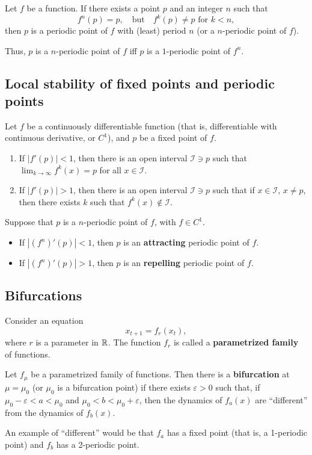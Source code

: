 \begin{definition}
Let $f$ be a function. If there exists a point $p$ and an integer $n$ such that
\[
f^n(p)=p,\quad\textrm{but}\quad f^k(p)\neq p\textrm{ for }k<n,
\]
then $p$ is a periodic point of $f$ with (least) period $n$ (or a $n$-periodic point of $f$).
\end{definition}
\vskip0.5cm
Thus, $p$ is a $n$-periodic point of $f$ iff $p$ is a $1$-periodic point of $f^n$.


\subsection{Local stability of fixed points and periodic points}
\begin{theorem}
Let $f$ be a continuously differentiable function (that is, differentiable with continuous derivative, or $C^1$), and $p$ be a fixed point of $f$. 
\begin{enumerate}
\item If $|f'(p)|<1$, then there is an open interval $\mathcal{I}\ni p$ such that $\lim_{k\to\infty}f^k(x)=p$ for all $x\in\mathcal{I}$.
\item If $|f'(p)|>1$, then there is an open interval $\mathcal{I}\ni p$ such that if $x\in\mathcal{I}$, $x\neq p$, then there exists $k$ such that $f^k(x)\not\in\mathcal{I}$.
\end{enumerate}
\end{theorem}
\begin{definition}
Suppose that $p$ is a $n$-periodic point of $f$, with $f\in C^1$. 
\begin{itemize}
\item If $|\left(f^n\right)'(p)|<1$, then $p$ is an \textbf{attracting} periodic point of $f$. 
\item If $|\left(f^n\right)'(p)|>1$, then $p$ is an \textbf{repelling} periodic point of $f$.
\end{itemize}
\end{definition}

\subsection{Bifurcations}
Consider an equation 
\begin{equation}
x_{t+1}=f_r(x_t),
\end{equation}
where $r$ is a parameter in $\mathbb{R}$.
The function $f_r$ is called a \textbf{parametrized family} of functions.


\begin{definition}[Bifurcation]
Let $f_\mu$ be a parametrized family of functions. Then there is a \textbf{bifurcation} at $\mu=\mu_0$ (or $\mu_0$ is a bifurcation point) if there exists $\varepsilon>0$ such that, if $\mu_0-\varepsilon<a<\mu_0$ and $\mu_0<b<\mu_0+\varepsilon$, then the dynamics of $f_a(x)$ are ``different'' from the dynamics of $f_b(x)$.
\end{definition}
\vskip0.5cm
An example of ``different'' would be that $f_a$ has a fixed point (that is, a 1-periodic point) and $f_b$ has a 2-periodic point.

